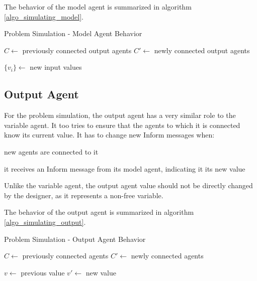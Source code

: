 The behavior of the model agent is summarized in algorithm \ref{algo_simulating_model}.

\begin{algorithm}
\caption{Problem Simulation - Model Agent Behavior}
\label{algo_simulating_model}

	$C \leftarrow$ previously connected output agents\;
	$C'\leftarrow$  newly connected output agents\;
	
	$\{v_i\} \leftarrow$ new input values\;
			
	
	
\end{algorithm}

\subsection{Output Agent}

For the problem simulation, the output agent has a very similar role to the variable agent. It too tries to ensure that the agents to which it is connected know its current value. It has to change new Inform messages when:
\begin{compactitem}
\item new agents are connected to it
\item it receives an Inform message from its model agent, indicating it its new value
\end{compactitem}

Unlike the variable agent, the output agent value should not be directly changed by the designer, as it represents a non-free variable.

The behavior of the output agent is summarized in algorithm \ref{algo_simulating_output}.

\begin{algorithm}
\caption{Problem Simulation - Output Agent Behavior}
\label{algo_simulating_output}

	$C \leftarrow$ previously connected agents\;
	$C'\leftarrow$  newly connected agents\;
		
	$v \leftarrow$ previous value\;
	$v'\leftarrow$ new value\;
	
	
	
\end{algorithm}

